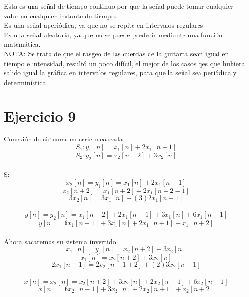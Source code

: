 \documentclass[10pt,a4paper]{report}
\begin{document}
\begin{itemize}
Esta es una señal de tiempo continuo por que la señal puede tomar cualquier valor en cualquier instante de tiempo. \\
Es una señal aperiódica, ya que no se repite en intervalos regulares \\
Es una señal aleatoria, ya que no se puede predecir mediante una función matemática.\\
NOTA: Se trató de que el rasgeo de las cuerdas de la guitarra sean igual en tiempo e intensidad, resultó un poco difícil, el mejor de los casos qes que hubiera salido igual la gráfica en intervalos regulares, para que la señal sea periódica y determinística.

\end{itemize}

\section{Ejercicio 9}

Conexión de sistemas en serie o cascada\\
\[
S_{1}: y_{1}\left [ n \right ]=x_{1}\left [ n \right ]+2x_{1}\left [ n-1 \right ]
\]
\[
S_{2}: y_{2}\left [ n \right ]=x_{2}\left [ n+2 \right ]+3x_{2}\left [ n \right ]
\]\\

S:\\
\[
x_{2}\left [ n \right ]=y_{1}\left [ n \right ]=x_{1}\left [ n \right ]+2x_{1}\left [ n-1 \right ]
\]
\[
x_{2}\left [ n+2 \right ]=x_{1}\left [ n+2 \right ]+2x_{1}\left [ n+2-1 \right ]
\]
\[
3x_{2}\left [ n \right ]=3x_{1}\left [ n \right ]+(3)2x_{1}\left [ n-1 \right ]
\]\\

\[
y\left [ n \right ]=y_{2}\left [ n \right ]=x_{1}\left [ n+2 \right ]+2x_{1}\left [ n+1 \right ]+3x_{1}\left [ n \right ]+6x_{1}\left [ n-1 \right ]
\]
\[
y\left [ n \right ]=6x_{1}\left [ n-1 \right ]+3x_{1}\left [ n \right ]+2x_{1}\left [ n+1 \right ]+x_{1}\left [ n+2 \right ]
\]\\

Ahora sacaremos su sistema invertido\\
\[
x_{1}\left [ n \right ]=y_{2}\left [ n \right ]=x_{2}\left [ n+2 \right ]+3x_{2}\left [ n \right ]
\]
\[
x_{1}\left [ n \right ]=x_{2}\left [ n+2 \right ]+3x_{2}\left [ n \right ]
\]
\[
2x_{1}\left [ n-1 \right ]=2x_{2}\left [ n-1+2 \right ]+(2)3x_{2}\left [ n-1 \right ]
\]\\

\[
x\left [ n \right ]=x_{2}\left [ n \right ]=x_{2}\left [ n+2 \right ]+3x_{2}\left [ n \right ]+2x_{2}\left [ n+1 \right ]+6x_{2}\left [ n-1 \right ]
\]
\[
x\left [ n \right ]=6x_{2}\left [ n-1 \right ]+3x_{2}\left [ n \right ]+2x_{2}\left [ n+1 \right ]+x_{2}\left [ n+2 \right ]
\]\\
\end{document}
